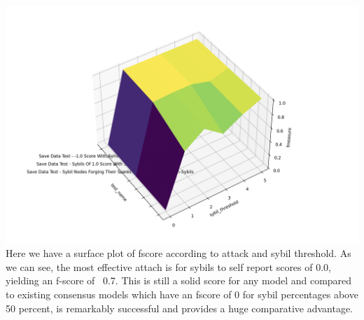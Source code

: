 \documentclass{article}
\begin{document}
\includegraphics[width=\textwidth, height=\textwidth]{f-score-surface-plot}
Here we have a surface plot of fscore according to attack and sybil threshold. As we can see, the most effective attach is for sybils to self report scores of 0.0, yielding an f-score of ~0.7. This is still a solid score for any model and compared to existing consensus models which have an fscore of 0 for sybil percentages above 50 percent, is remarkably successful and provides a huge comparative advantage.
\end{document}
